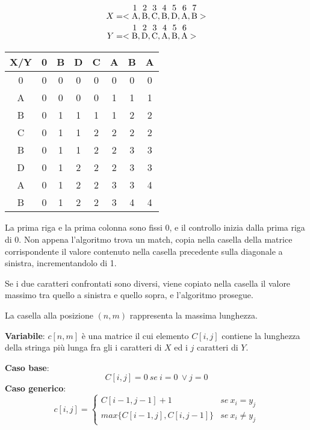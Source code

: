 \begin{example}{}{}

\begin{align*}
	X &= <\stackon{A}{1}, \stackon{B}{2}, \stackon{C}{3}, \stackon{B}{4}, \stackon{D}{5}, \stackon{A}{6}, \stackon{B}{7}> \\
	Y &= <\stackon{B}{1}, \stackon{D}{2}, \stackon{C}{3}, \stackon{A}{4}, \stackon{B}{5}, \stackon{A}{6}>
\end{align*}

\begin{center}
	\begin{tabular}{ c | c | c | c | c | c | c | c | }
		X/Y & 0 & B & D & C & A & B & A \\ \hline
		0 & 0 & 0 & 0 & 0 & 0 & 0 & 0 \\ \hline
		A & 0 & 0 & 0 & 0 & 1 & 1 & 1 \\ \hline
		B & 0 & 1 & 1 & 1 & 1 & 2 & 2 \\ \hline
		C & 0 & 1 & 1 & 2 & 2 & 2 & 2 \\ \hline
		B & 0 & 1 & 1 & 2 & 2 & 3 & 3 \\ \hline
		D & 0 & 1 & 2 & 2 & 2 & 3 & 3 \\ \hline
		A & 0 & 1 & 2 & 2 & 3 & 3 & 4 \\ \hline
		B & 0 & 1 & 2 & 2 & 3 & 4 & 4 \\ \hline
	\end{tabular}
\end{center}

\end{example}

La prima riga e la prima colonna sono fissi 0, e il controllo inizia dalla prima riga di 0. Non appena l'algoritmo trova un match, copia nella casella della matrice corrispondente il valore contenuto nella casella precedente sulla diagonale a sinistra, incrementandolo di 1.

Se i due caratteri confrontati sono diversi, viene copiato nella casella il valore massimo tra quello a sinistra e quello sopra, e l'algoritmo prosegue.

La casella alla posizione $(n, m)$ rappresenta la massima lunghezza. 

\textbf{Variabile}:
$c[n, m]$ è una matrice il cui elemento $C[i, j]$ contiene la lunghezza della stringa più lunga fra gli i caratteri di $X$ ed i $j$ caratteri di $Y$.

\textbf{Caso base}:
$$C[i, j] = 0\ se\ i = 0\ \lor j = 0 $$
\textbf{Caso generico}:
$$c[i, j] = \begin{cases}
	C[i-1, j-1] + 1 & se\ x_i = y_j \\
	max\{C[i-1, j], C[i, j-1]\} & se\ x_i \neq y_j
\end{cases}$$

